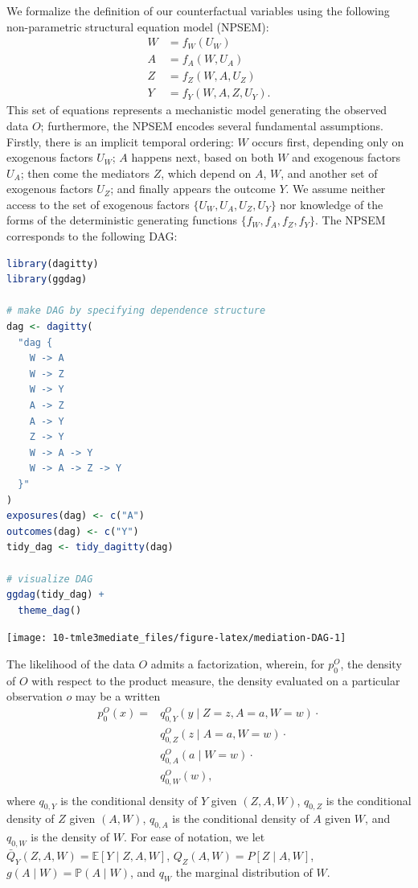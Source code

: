\documentclass[12pt, krantz2,]{krantz}
\theoremstyle{definition}
\theoremstyle{definition}
\theoremstyle{definition}
\renewcommand{\P}{\mathbb{P}}
\newcommand{\E}{\mathbb{E}}
\newcommand{\1}{\mathbbm{1}}
\begin{document}
We formalize the definition of our counterfactual variables using the following
non-parametric structural equation model (NPSEM):
\begin{align}
  W &= f_W(U_W) \\
  A &= f_A(W, U_A) \\
  Z &= f_Z(W, A, U_Z) \\
  Y &= f_Y(W, A, Z, U_Y).
  \label{eq:npsem-mediate}
\end{align}
This set of equations
represents a mechanistic model generating the observed data \(O\); furthermore,
the NPSEM encodes several fundamental assumptions. Firstly, there is an implicit
temporal ordering: \(W\) occurs first, depending only on exogenous factors \(U_W\);
\(A\) happens next, based on both \(W\) and exogenous factors \(U_A\); then come the
mediators \(Z\), which depend on \(A\), \(W\), and another set of exogenous factors
\(U_Z\); and finally appears the outcome \(Y\). We assume neither access to the set
of exogenous factors \(\{U_W, U_A, U_Z, U_Y\}\) nor knowledge of the forms of the
deterministic generating functions \(\{f_W, f_A, f_Z, f_Y\}\). The NPSEM
corresponds to the following DAG:

\begin{lstlisting}[language=R]
library(dagitty)
library(ggdag)

# make DAG by specifying dependence structure
dag <- dagitty(
  "dag {
    W -> A
    W -> Z
    W -> Y
    A -> Z
    A -> Y
    Z -> Y
    W -> A -> Y
    W -> A -> Z -> Y
  }"
)
exposures(dag) <- c("A")
outcomes(dag) <- c("Y")
tidy_dag <- tidy_dagitty(dag)

# visualize DAG
ggdag(tidy_dag) +
  theme_dag()
\end{lstlisting}

\begin{center}\texttt{[image: 10-tmle3mediate\_files/figure-latex/mediation-DAG-1]} \end{center}

The likelihood of the data \(O\) admits a factorization, wherein, for \(p_0^O\),
the density of \(O\) with respect to the product measure, the density evaluated
on a particular observation \(o\) may be a written
\begin{align}
  p_0^O(x) = &q^O_{0,Y}(y \mid Z = z, A = a, W = w) \cdot \\
    &q^O_{0,Z}(z \mid A = a, W = w) \cdot \\
    &q^O_{0,A}(a \mid W = w) \cdot \\
    &q^O_{0,W}(w),\\
  \label{eq:likelihood-factorization-mediate}
\end{align}
where \(q_{0, Y}\) is the conditional density of \(Y\) given \((Z, A, W)\), \(q_{0, Z}\)
is the conditional density of \(Z\) given \((A, W)\), \(q_{0, A}\) is the conditional
density of \(A\) given \(W\), and \(q_{0, W}\) is the density of \(W\). For ease of
notation, we let \(\bar{Q}_Y(Z, A, W) = \E[Y \mid Z, A, W]\), \(Q_Z(A, W) = P[Z \mid A, W]\), \(g(A \mid W) = \P(A \mid W)\), and \(q_W\) the marginal
distribution of \(W\).
\end{document}
